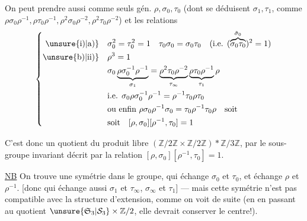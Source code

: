 On peut prendre aussi comme seuls gén. $\rho,\sigma_0,\tau_0$ (dont se déduisent $\sigma_1,\tau_1$, \inserted{$\sigma_\infty,\tau_\infty$} comme $\rho\sigma_0\rho^{-1},\rho\tau_0\rho^{-1},\rho^2\sigma_0\rho^{-2},\rho^2\tau_0\rho^{-2}$) et les relations
\[
\left\{\begin{aligned}
\unsure{\text{i)}|\text{a)}}\quad&\sigma_0^2=\tau_0^2=1\quad\tau_0\sigma_0=\sigma_0\tau_0\quad\text{(i.e. }(\overbrace{\sigma_0\tau_0}^{\tilde\sigma_0})^2=1\text{)}\\
\unsure{\text{b)}|\text{ii)}}\quad&\rho^3=1\\
&\sigma_0\underbrace{\rho\sigma_0^{-1}\rho^{-1}}_{\sigma_1}=\underbrace{\rho^2\tau_0\rho^{-2}}_{\tau_\infty}\underbrace{\rho\tau_0\rho^{-1}}_{\tau_1}\rho\\
&\text{i.e. }\sigma_0\rho\sigma_0^{-1}\rho^{-1}=\rho^{-1}\tau_0\rho\tau_0\\
&\text{ou enfin }\rho\sigma_0\rho^{-1}\sigma_0=\tau_0\rho^{-1}\tau_0\rho\quad\text{soit}\\
&\text{soit}\quad[\rho,\sigma_0][\rho^{-1},\tau_0]=1
\end{aligned}\right.
\]

C'est donc un quotient du produit libre $(\mathbb Z/2\mathbb Z\times\mathbb Z/2\mathbb Z)*\mathbb Z/3\mathbb Z$, par le sous-groupe invariant décrit par la relation $[\rho,\sigma_0][\rho^{-1},\tau_0]=1$.

\uline{NB} On trouve une symétrie dans le groupe, qui échange $\sigma_0$ et $\tau_0$, et échange $\rho$ et $\rho^{-1}$. [donc qui échange aussi $\sigma_1$ et $\tau_\infty$, $\sigma_\infty$ et $\tau_1$] --- mais cette symétrie n'est pas compatible avec la structure d'extension, comme on voit de suite (en en passant au quotient $\unsure{\mathfrak S_3|\mathcal S_3}\times\mathbb Z/2$, elle devrait conserver le centre!).
